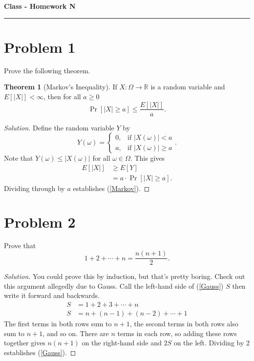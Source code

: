 \documentclass[11pt,letterpaper]{report}
\newcommand{\reals}{\mathbb{R}}
\newenvironment{solution}
{\begin{proof}[Solution]}
{\end{proof}}
\theoremstyle{definition}
\newtheorem{theorem}{Theorem}
\begin{document}
\begin{center}
{\bf \Large Class - Homework N}
\vspace{0.2cm}
\hrule
\end{center}

\section*{Problem 1}
Prove the following theorem.
\begin{theorem}[Markov's Inequality]
	If $X:\Omega\to \reals$ is a random variable and $E[|X|]<\infty$, then for all $a\geq 0$
	\begin{equation}\label{Markov}
		\Pr[|X|\geq a] \leq \frac{E[|X|]}{a}.
	\end{equation}
\end{theorem}

\begin{solution}
	Define the random variable $Y$ by
	\[
	Y(\omega) = \begin{cases}
		0,&\text{if }|X(\omega)|<a\\
		a,&\text{if }|X(\omega)|\geq a
	\end{cases}.
	\]
	Note that $Y(\omega)\leq |X(\omega)|$ for all $\omega\in \Omega$. This gives
	\begin{align*}
		E[|X|] &\geq E[Y]\\
		&= a\cdot \Pr[|X|\geq a].
	\end{align*}
	Dividing through by $a$ establishes (\ref{Markov}).
\end{solution}


\section*{Problem 2}
Prove that
\begin{equation}\label{Gauss}
	1 + 2 + \cdots + n = \frac{n(n+1)}{2}.
\end{equation}

\begin{solution}
	You could prove this by induction, but that's pretty boring. Check out this argument allegedly due to Gauss. Call the left-hand side of (\ref{Gauss}) $S$ then write it forward and backwards.
	\begin{align*}
		S &= 1 + 2 + 3 + \cdots + n\\
		S &= n + (n-1) + (n-2) + \cdots +1
	\end{align*}
	The first terms in both rows sum to $n+1$, the second terms in both rows also sum to $n+1$, and so on. There are $n$ terms in each row, so adding these rows together gives $n(n+1)$ on the right-hand side and $2S$ on the left. Dividing by 2 establishes (\ref{Gauss}).
\end{solution}
\end{document}
